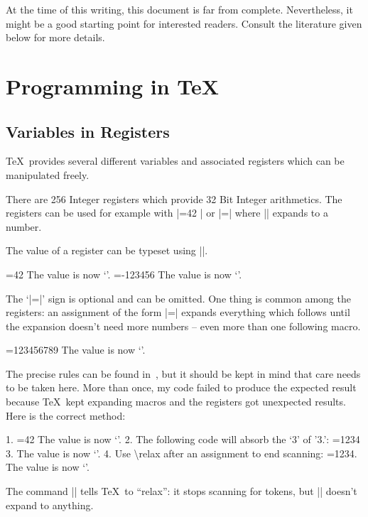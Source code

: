 At the time of this writing, this document is far from complete. Nevertheless, it might be a good starting point for interested readers. Consult the literature given below for more details.

\section{Programming in \TeX}
\subsection{Variables in Registers}
\TeX\ provides several different variables and associated registers which can be manipulated freely.

\label{sec:variables}
\begin{command}{\count{}}
	There are 256 Integer registers which provide 32 Bit Integer arithmetics. The registers can be used for example with |=42 | or |=\macro | where |\macro| expands to a number.

	The value of a register can be typeset using |\the|.
\begin{codeexample}[]
=42
The value is now `\the{}'. 
\def\macro{-123456}
=\macro 
The value is now `\the{}'.
\end{codeexample}
	
	The `|=|' sign is optional and can be omitted. One thing is common among the registers: an assignment of the form |=|\meta{$\cdots$} expands everything which follows until the expansion doesn't need more numbers -- even more than one following macro.
\begin{codeexample}[]
\def\firstmacro{123}
\def\secondmacro{456}
\def\thirdmacro{789}
=\firstmacro\secondmacro\thirdmacro
The value is now `\the{}'.
\end{codeexample}
 The precise rules can be found in~\cite{texbook}, but it should be kept in mind that care needs to be taken here. More than once, my code failed to produce the expected result because \TeX\ kept expanding macros and the registers got unexpected results. Here is the correct method:
\begin{codeexample}[]
1. =42 %
The value is now `\the{}'.
2. The following code will absorb the `3' of '3.':
\def\macro{1234}
=\macro %
3. The value is now `\the{}'.
4. Use \textbackslash relax after an assignment to end scanning:
=\macro{}. The value is now `\the{}'.
\end{codeexample}
	The command |\relax| tells \TeX\ to ``relax'': it stops scanning for tokens, but |\relax| doesn't expand to anything.
\end{command}

